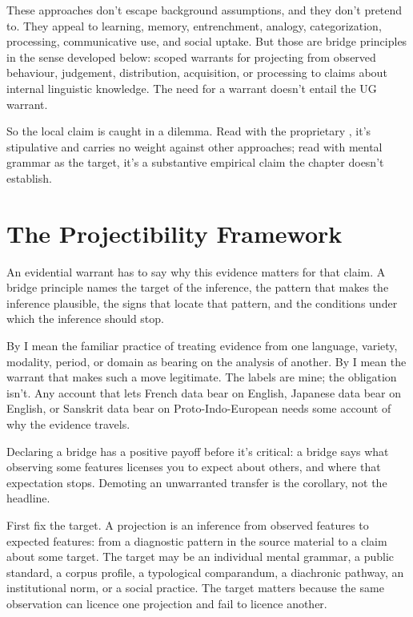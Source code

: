 \documentclass[12pt]{article}
\begin{document}
These approaches don't escape background assumptions, and they don't pretend to. They appeal to learning, memory, entrenchment, analogy, categorization, processing, communicative use, and social uptake. But those are bridge principles in the sense developed below: scoped warrants for projecting from observed behaviour, judgement, distribution, acquisition, or processing to claims about internal linguistic knowledge. The need for a warrant doesn't entail the UG warrant.

So the local claim is caught in a dilemma. Read with the proprietary , it's stipulative and carries no weight against other approaches; read with mental grammar as the target, it's a substantive empirical claim the chapter doesn't establish.

\section{The Projectibility Framework}\label{sec:projectibility}

An evidential warrant has to say why this evidence matters for that claim. A bridge principle names the target of the inference, the pattern that makes the inference plausible, the signs that locate that pattern, and the conditions under which the inference should stop.

By  I mean the familiar practice of treating evidence from one language, variety, modality, period, or domain as bearing on the analysis of another. By  I mean the warrant that makes such a move legitimate. The labels are mine; the obligation isn't. Any account that lets French data bear on English, Japanese data bear on English, or Sanskrit data bear on Proto-Indo-European needs some account of why the evidence travels.

Declaring a bridge has a positive payoff before it's critical: a bridge says what observing some features licenses you to expect about others, and where that expectation stops. Demoting an unwarranted transfer is the corollary, not the headline.

First fix the target. A projection is an inference from observed features to expected features: from a diagnostic pattern in the source material to a claim about some target. The target may be an individual mental grammar, a public standard, a corpus profile, a typological comparandum, a diachronic pathway, an institutional norm, or a social practice. The target matters because the same observation can licence one projection and fail to licence another.
\end{document}
